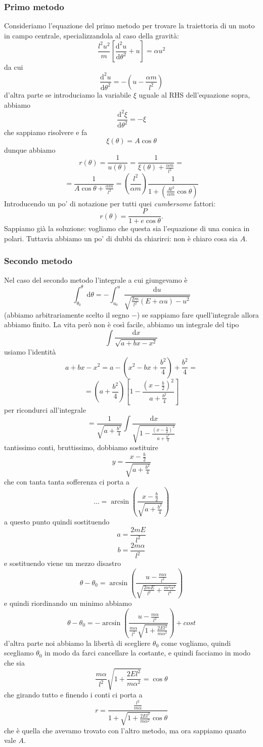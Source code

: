 \documentclass[11pt]{scrartcl}
\newcommand{\dif}{\text{d}}
\begin{document}
	\subsubsection{Primo metodo}
	Consideriamo l'equazione del primo metodo per trovare la traiettoria di un moto in campo centrale, specializzandola al caso della gravità:
	$$\frac{l^2u^2}{m}\left[\frac{\dif^2 u}{\dif \theta^2}+u\right]=\alpha u^2$$
	da cui 
	$$\frac{\dif^2 u}{\dif \theta^2}=-\left(u-\frac{\alpha m}{l^2}\right)$$
	d'altra parte se introduciamo la variabile $\xi$ uguale al RHS dell'equazione sopra, abbiamo
	$$\frac{\dif^2\xi}{\dif \theta^2}=-\xi$$
	che sappiamo risolvere e fa
	$$\xi(\theta)=A\cos\theta$$
	dunque abbiamo 
	$$r(\theta)=\frac{1}{u(\theta)}=\frac{1}{\xi(\theta)+\frac{\alpha m}{l^2}}=$$
	$$=\frac{1}{A\cos \theta + \frac{\alpha m}{l^2}}=\boxed{\left(\frac{l^2}{\alpha m}\right)\frac{1}{1+\left(\frac{Al^2}{\alpha m}\cos\theta\right)}}$$ 
	Introducendo un po' di notazione per tutti quei \textit{cumbersome} fattori:
	$$r(\theta)=\frac{P}{1+e\cos\theta}.$$
	Sappiamo già la soluzione: vogliamo che questa sia l'equazione di una conica in polari. Tuttavia abbiamo un po' di dubbi da chiarirci: non è chiaro cosa sia $A$. 
	
	\subsubsection{Secondo metodo}
	
	Nel caso del secondo metodo l'integrale a cui giungevamo è
	$$\int_{\theta_0}^\theta\dif \theta=-\int_{u_0}^u\frac{\dif u}{\sqrt{\frac{2m}{l^2}\left(E+\alpha u\right)-u^2}}$$
	(abbiamo arbitrariamente scelto il segno $-$) se sappiamo fare quell'integrale allora abbiamo finito. La vita però non è così facile, abbiamo un integrale del tipo
	$$\int \frac{\dif x}{\sqrt{a+bx-x^2}}$$
	usiamo l'identità
	$$a+bx-x^2=a-\left(x^2-bx+\frac{b^2}{4}\right)+\frac{b^2}{4}=$$
	$$=\left(a+\frac{b^2}{4}\right)\left[1-\frac{\left(x-\frac{b}{2}\right)^2}{a+\frac{b^2}{4}}\right]$$
	per ricondurci all'integrale
	$$=\frac{1}{\sqrt{a+\frac{b^2}{4}}}\int \frac{\dif x}{\sqrt{1-\frac{\left(x-\frac{b}{2}\right)^2}{a+\frac{b^2}{4}}}}$$
	tantissimo conti, bruttissimo, dobbiamo sostituire 
	$$y=\frac{x-\frac{b}{2}}{\sqrt{a+\frac{b^2}{4}}}$$
	che con tanta tanta sofferenza ci porta a 
	$$\dots = \arcsin\left(\frac{x-\frac{b}{2}}{\sqrt{a+\frac{b^2}{4}}}\right)$$
	a questo punto quindi sostituendo 
	$$a=\frac{2mE}{l^2}$$
	$$b=\frac{2m\alpha}{l^2}$$
	e sostituendo viene un mezzo disastro
	$$\theta-\theta_0=\arcsin\left(\frac{u-\frac{m\alpha}{l^2}}{\sqrt{\frac{2mE}{l^2}+\frac{m^2\alpha^2}{l^4}}}\right)$$
	e quindi riordinando un minimo abbiamo
	$$\theta-\theta_0=-\arcsin\left(\frac{u-\frac{m\alpha}{l^2}}{\frac{m\alpha}{l^2}\sqrt{1+\frac{2El^2}{m\alpha^2}}}\right)+cost$$
	d'altra parte noi abbiamo la libertà di scegliere $\theta_0$ come vogliamo, quindi scegliamo $\theta_0$ in modo da farci cancellare la costante, e quindi facciamo in modo che sia
	$$\frac{m\alpha}{l^2}\sqrt{1+\frac{2El^2}{m\alpha^2}}=\cos\theta$$
	che girando tutto e finendo i conti ci porta a 
	$$r=\frac{\frac{l^2}{m\alpha}}{1+\sqrt{1+\frac{2El^2}{m\alpha^2}}\cos\theta}$$
	che è quella che avevamo trovato con l'altro metodo, ma ora sappiamo quanto vale $A$.
	
\end{document}
